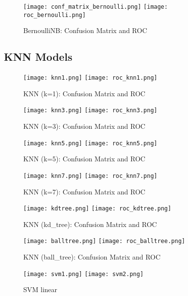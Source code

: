 \documentclass[12pt]{article}
\begin{document}
\begin{figure}[H]
\centering
\texttt{[image: conf\_matrix\_bernoulli.png]}
\texttt{[image: roc\_bernoulli.png]}
\caption{BernoulliNB: Confusion Matrix and ROC}
\end{figure}

\subsection*{KNN Models}

\begin{figure}[H]
\centering
\texttt{[image: knn1.png]}
\texttt{[image: roc\_knn1.png]}
\caption{KNN (k=1): Confusion Matrix and ROC}
\end{figure}

\begin{figure}[H]
\centering
\texttt{[image: knn3.png]}
\texttt{[image: roc\_knn3.png]}
\caption{KNN (k=3): Confusion Matrix and ROC}
\end{figure}

\begin{figure}[H]
\centering
\texttt{[image: knn5.png]}
\texttt{[image: roc\_knn5.png]}
\caption{KNN (k=5): Confusion Matrix and ROC}
\end{figure}

\begin{figure}[H]
\centering
\texttt{[image: knn7.png]}
\texttt{[image: roc\_knn7.png]}
\caption{KNN (k=7): Confusion Matrix and ROC}
\end{figure}

\begin{figure}[H]
\centering
\texttt{[image: kdtree.png]}
\texttt{[image: roc\_kdtree.png]}
\caption{KNN (kd\_tree): Confusion Matrix and ROC}
\end{figure}

\begin{figure}[H]
\centering
\texttt{[image: balltree.png]}
\texttt{[image: roc\_balltree.png]}
\caption{KNN (ball\_tree): Confusion Matrix and ROC}
\end{figure}

\begin{figure}[H]
\centering
\texttt{[image: svm1.png]}
\texttt{[image: svm2.png]}
\caption{SVM linear}
\end{figure}
\end{document}
